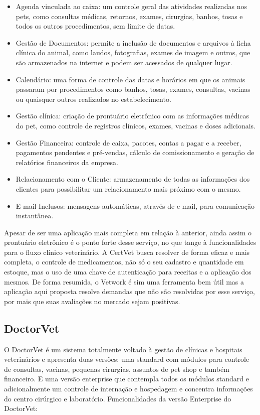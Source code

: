 \documentclass[
    12pt,               %
    openright,          %
    oneside,
    a4paper,            %
    BIBLATEX,           %
    TODO,               %
    english,            %
    brazil              %
    ]{ifsp-spo-inf-ctds}
\begin{document}
\begin{itemize}
    \item Agenda vinculada ao caixa: um controle geral das atividades realizadas nos pets, como consultas médicas, retornos, exames, cirurgias, banhos, tosas e todos os outros procedimentos, sem limite de datas.
    \item Gestão de Documentos: permite a inclusão de documentos e arquivos à ficha clínica do animal, como laudos, fotografias, exames de imagem e outros, que são armazenados na internet e podem ser acessados de qualquer lugar.
    \item Calendário: uma forma de controle das datas e horários em que os animais passaram por procedimentos como banhos, tosas, exames, consultas, vacinas ou quaisquer outros realizados no estabelecimento.
    \item Gestão clínica: criação de prontuário eletrônico com as informações médicas do pet, como controle de registros clínicos, exames, vacinas e doses adicionais.
    \item Gestão Financeira: controle de caixa, pacotes, contas a pagar e a receber, pagamentos pendentes e pré-vendas, cálculo de comissionamento e geração de relatórios financeiros da empresa.
    \item Relacionamento com o Cliente: armazenamento de todas as informações dos clientes para possibilitar um relacionamento mais próximo com o mesmo.
    \item E-mail Inclusos: mensagens automáticas, através de e-mail, para comunicação instantânea.
\end{itemize}

Apesar de ser uma aplicação mais completa em relação à anterior, ainda assim o prontuário eletrônico é o ponto forte desse serviço, no que tange à funcionalidades para o fluxo clínico veterinário. A CertVet busca resolver de forma eficaz e mais completa, o controle de medicamentos, não só o seu cadastro e quantidade em estoque, mas o uso de uma chave de autenticação para receitas e a aplicação dos mesmos. De forma resumida, o Vetwork é sim uma ferramenta bem útil mas a aplicação aqui proposta resolve demandas que não são resolvidas por esse serviço, por mais que suas avaliações no mercado sejam positivas.

\subsection{DoctorVet}
O DoctorVet é um sistema totalmente voltado à gestão de clínicas e hospitais veterinários e apresenta duas versões: uma standard com módulos para controle de consultas, vacinas, pequenas cirurgias, assuntos de pet shop e também financeiro. E uma versão enterprise que contempla todos os módulos standard e adicionalmente um controle de internação e hospedagem e concentra informações do centro cirúrgico e laboratório.  Funcionalidades da versão Enterprise do DoctorVet:
\end{document}
